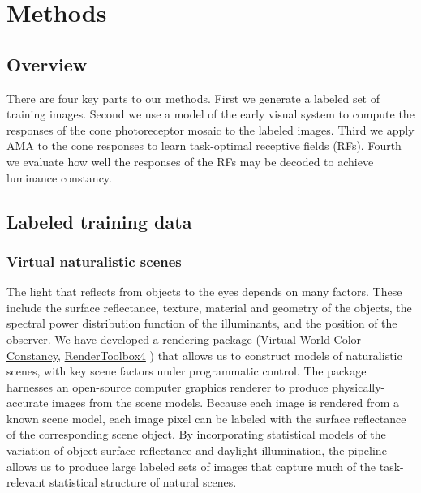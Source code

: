 \documentclass{jov}
\begin{document}
\section*{Methods} \label{Methods}
\subsection{Overview}
There are four key parts to our methods.  First we generate a labeled set of training images.  Second we use a model of the early visual system to compute the responses of the cone photoreceptor mosaic to the labeled images. Third we apply AMA to the cone responses to learn task-optimal receptive fields (RFs). Fourth we evaluate how well the responses of the RFs may be decoded to achieve luminance constancy.

\subsection{Labeled training data} \label{method:VirtualWorld}
\subsubsection{Virtual naturalistic scenes}
The light that reflects from objects to the eyes depends on many factors.
These include the surface reflectance, texture, material and geometry of the objects, 
the spectral power distribution function of the illuminants, and the position of the observer.
We have developed a rendering package 
(\href{https://github.com/BrainardLab/VirtualWorldColorConstancy}{Virtual World Color Constancy}, \href{http://rendertoolbox.org}{RenderToolbox4} \cite{heasly2014rendertoolbox3}) 
that allows us to construct models of naturalistic scenes, with key scene factors under programmatic control.
The package harnesses an open-source computer graphics renderer 
\cite{jakob2015mitsuba} to produce physically-accurate images from the scene models.
Because each image is rendered from a known scene model, each image pixel can be labeled with 
the surface reflectance of the corresponding scene object.
By incorporating statistical models of the variation of object surface reflectance and daylight illumination, 
the pipeline allows us to produce large labeled sets of images that capture much of the task-relevant 
statistical structure of natural scenes.
\end{document}

